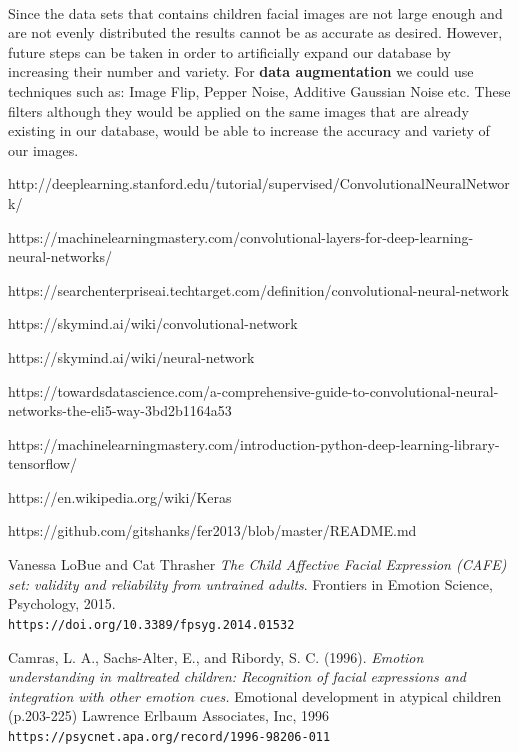 \documentclass[runningheads,a4paper,11pt]{report}
\begin{document}
\paragraph{}
Since the data sets that contains children facial images are not large enough and are not evenly distributed the results cannot be as accurate as desired. However, future steps can be taken in order to artificially expand our database by increasing their number and variety. For \textbf{data augmentation} we could use techniques such as: Image Flip, Pepper Noise, Additive Gaussian Noise etc. These filters although they would be applied on the same images that are already existing in our database, would be able to increase the accuracy and variety of our images.



%
\begin{thebibliography}{1}
   http://deeplearning.stanford.edu/tutorial/supervised/ConvolutionalNeuralNetwork/

   https://machinelearningmastery.com/convolutional-layers-for-deep-learning-neural-networks/

   https://searchenterpriseai.techtarget.com/definition/convolutional-neural-network

   https://skymind.ai/wiki/convolutional-network

   https://skymind.ai/wiki/neural-network

   https://towardsdatascience.com/a-comprehensive-guide-to-convolutional-neural-networks-the-eli5-way-3bd2b1164a53

   https://machinelearningmastery.com/introduction-python-deep-learning-library-tensorflow/

   https://en.wikipedia.org/wiki/Keras

    https://github.com/gitshanks/fer2013/blob/master/README.md


Vanessa LoBue and Cat Thrasher
\textit{The Child Affective Facial Expression (CAFE) set: validity and reliability from untrained adults}.
Frontiers in Emotion Science, Psychology, 2015.
\\\texttt{https://doi.org/10.3389/fpsyg.2014.01532}


Camras, L. A., Sachs-Alter, E., and Ribordy, S. C. (1996). \textit{Emotion understanding in maltreated children: Recognition of facial expressions and integration with other emotion cues.}
Emotional development in atypical children (p.203-225) Lawrence Erlbaum Associates, Inc, 1996
\\\texttt{https://psycnet.apa.org/record/1996-98206-011}



\end{thebibliography}
\end{document}
